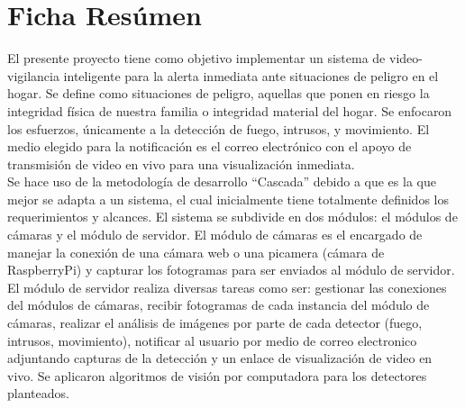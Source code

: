 \chapter{\centering Ficha Resúmen}

\begin{center}
    \begin{minipage}{14cm}

    El presente proyecto tiene como objetivo implementar un sistema de video-vigilancia inteligente para la alerta inmediata ante situaciones de peligro en el hogar. Se define como situaciones de peligro, aquellas que ponen en riesgo la integridad física de nuestra familia o integridad material del hogar. Se enfocaron los esfuerzos, únicamente a la detección de fuego, intrusos, y movimiento. El medio elegido para la notificación es el correo electrónico con el apoyo de transmisión de video en vivo para una visualización inmediata.\\

    Se hace uso de la metodología de desarrollo ``Cascada'' debido a que es la que mejor se adapta a un sistema, el cual inicialmente tiene totalmente definidos los requerimientos y alcances. El sistema se subdivide en dos módulos: el módulos de cámaras y el módulo de servidor.  El módulo de cámaras es el encargado de manejar la conexión de una cámara web o una picamera (cámara de RaspberryPi) y capturar los fotogramas para ser enviados al módulo de servidor. El módulo de servidor realiza diversas tareas como ser: gestionar las conexiones del módulos de cámaras, recibir fotogramas de cada instancia del módulo de cámaras, realizar el análisis de imágenes por parte de cada detector (fuego, intrusos, movimiento), notificar al usuario por medio de correo electronico adjuntando capturas de la detección y un enlace de visualización de video en vivo. Se aplicaron algoritmos de visión por computadora para los detectores planteados.\\
    \end{minipage}
\end{center}